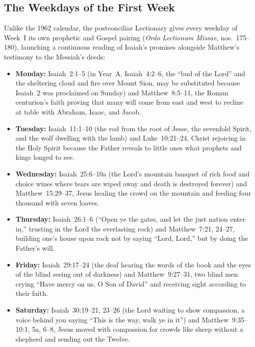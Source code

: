 \subsection{The Weekdays of the First Week}

Unlike the 1962 calendar, the postconciliar Lectionary gives every weekday of Week~I its own prophetic and Gospel pairing (\textit{Ordo Lectionum Missae}, nos.~175--180), launching a continuous reading of Isaiah's promises alongside Matthew's testimony to the Messiah's deeds:

\begin{itemize}
  \item \textbf{Monday:} Isaiah~2:1--5 (in Year~A, Isaiah~4:2--6, the ``bud of the Lord'' and the sheltering cloud and fire over Mount Sion, may be substituted because Isaiah~2 was proclaimed on Sunday) and Matthew~8:5--11, the Roman centurion's faith proving that many will come from east and west to recline at table with Abraham, Isaac, and Jacob.
  \item \textbf{Tuesday:} Isaiah~11:1--10 (the rod from the root of Jesse, the sevenfold Spirit, and the wolf dwelling with the lamb) and Luke~10:21--24, Christ rejoicing in the Holy Spirit because the Father reveals to little ones what prophets and kings longed to see.
  \item \textbf{Wednesday:} Isaiah~25:6--10a (the Lord's mountain banquet of rich food and choice wines where tears are wiped away and death is destroyed forever) and Matthew~15:29--37, Jesus healing the crowd on the mountain and feeding four thousand with seven loaves.
  \item \textbf{Thursday:} Isaiah~26:1--6 (``Open ye the gates, and let the just nation enter in,'' trusting in the Lord the everlasting rock) and Matthew~7:21, 24--27, building one's house upon rock not by saying ``Lord, Lord,'' but by doing the Father's will.
  \item \textbf{Friday:} Isaiah~29:17--24 (the deaf hearing the words of the book and the eyes of the blind seeing out of darkness) and Matthew~9:27--31, two blind men crying ``Have mercy on us, O Son of David'' and receiving sight according to their faith.
  \item \textbf{Saturday:} Isaiah~30:19--21, 23--26 (the Lord waiting to show compassion, a voice behind you saying ``This is the way, walk ye in it'') and Matthew~9:35--10:1, 5a, 6--8, Jesus moved with compassion for crowds like sheep without a shepherd and sending out the Twelve.
\end{itemize}


